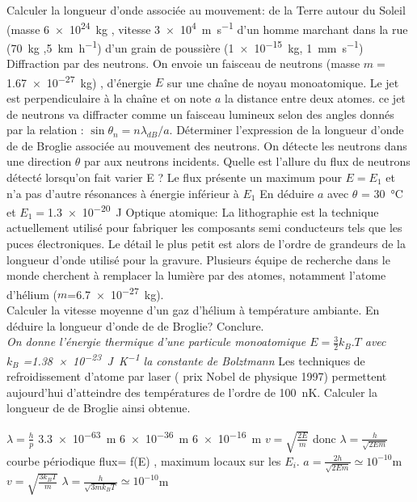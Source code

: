 \begin{Exercise}[title=Longueur d'onde de Broglie]
  \Question Calculer la longueur d'onde associée au mouvement:
  \subQuestion de la Terre autour du Soleil (masse \SI{6e24}{kg} , vitesse \SI{3e4}{\m\per\s}
  \subQuestion d'un homme marchant dans la rue (\SI{70}{kg} ,\SI{5}{\km\per\hour})
  \subQuestion d'un grain de poussière (\SI{1e-15}{kg}, \SI{1}{\mm\per\s})
  \Question Diffraction par des neutrons. On envoie un faisceau de neutrons
  (masse $m=$ \SI{1.67e-27}{kg}) , d'énergie $E$ sur une chaîne de noyau
  monoatomique. Le jet est perpendiculaire à la chaîne et on note $a$ la
  distance entre deux atomes. ce jet de neutrons va diffracter comme un faisceau
  lumineux selon des angles donnés par la relation : $\sin\theta_n = n\lambda_{dB}/a$.
  \subQuestion Déterminer l'expression de la longueur d'onde de de Broglie
  associée au mouvement des neutrons.
  \subQuestion On détecte les neutrons dans une direction $\theta$ par aux neutrons
  incidents. Quelle est l'allure du flux de neutrons détecté lorsqu'on fait varier E ?
  \subQuestion Le flux présente un maximum pour $E=E_1$ et n'a pas d'autre
  résonances à énergie inférieur à $E_1$ En déduire $a$ avec $\theta$ =
  \SI{30}{\celsius} et $E_1=$\SI{1.3e-20}{J}
  \Question Optique atomique:
  \subQuestion La lithographie est la technique actuellement utilisé pour
  fabriquer les composants semi conducteurs tels que les puces électroniques. Le
  détail le plus petit est alors de l'ordre de grandeurs de la longueur d'onde
  utilisé pour la gravure.
  Plusieurs équipe  de recherche dans le monde cherchent à remplacer la lumière
  par des atomes, notamment l'atome d'hélium ($m$=\SI{6.7e-27}{kg}).\\
  Calculer la vitesse moyenne d'un gaz d'hélium à température ambiante. En
  déduire la longueur d'onde de de Broglie? Conclure.\\
  \emph{On donne l'énergie thermique d'une particule monoatomique
    $E=\frac{3}{2}k_B.T$ avec\\ $k_B$ =\SI{1.38e-23}{\J\per\K} la constante de
    Bolztmann}
  \subQuestion Les techniques de refroidissement d'atome par laser ( prix Nobel
  de physique 1997) permettent aujourd'hui d'atteindre des températures de
  l'ordre de \SI{100}{nK}. Calculer la longueur de de Broglie ainsi obtenue.
\end{Exercise}
\begin{Answer}
  \Question $\lambda=\frac{h}{p}$
  \subQuestion \SI{3.3e-63}{m}
  \subQuestion \SI{6e-36}{m}
  \subQuestion \SI{6e-16}{m}
  \Question
  \subQuestion $v= \sqrt{\frac{2E}{m}} $ donc $\lambda=\frac{h}{\sqrt{2Em}}$
  \subQuestion courbe périodique flux= f(E) , maximum locaux sur les $E_i$.
  \subQuestion $a= \frac{2h}{\sqrt{2Em}} \simeq 10^{-10}$m
  \Question
  \subQuestion $v=\sqrt{\frac{3k_BT}{m}}$
  \subQuestion $\lambda= \frac{h}{\sqrt{3mk_BT}} \simeq 10^{-10}$m
\end{Answer}
